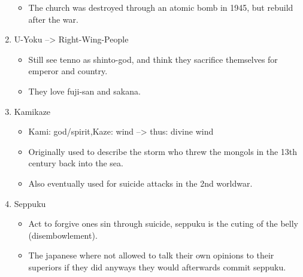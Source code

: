 \documentclass{article}
\newcommand\tabni[1][0.2cm]{\hspace*{#1}}
\begin{document}
\begin{enumerate}[itemsep=-6pt]
\begin{itemize}
\item The church was destroyed through an atomic bomb in 1945, but rebuild after the war. \\
\end{itemize}
\item {} \tabni U-Yoku --> Right-Wing-People 
\begin{itemize}
\item Still see tenno as shinto-god, and think they sacrifice themselves for emperor and country.
\item They love fuji-san and sakana. \\
\end{itemize}
\item {} \tabni Kamikaze
\begin{itemize}
\item Kami: god/spirit,\tabni Kaze: wind --> thus: divine wind
\item Originally used to describe the storm who threw the mongols in the 13th century back into the sea. \item Also eventually used for suicide attacks in the 2nd worldwar. \\
\end{itemize}
\item {} \tabni Seppuku
\begin{itemize}
\item Act to forgive ones sin through suicide, seppuku is the cuting of the belly (disembowlement).
\item The japanese where not allowed to talk their own opinions to their superiors if they did anyways they would afterwards commit seppuku.
\end{itemize}
\end{enumerate}
\end{document}
